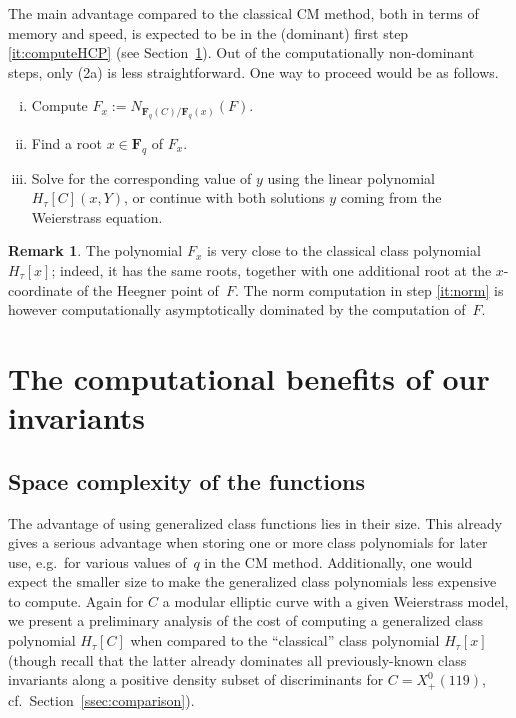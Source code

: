 \documentclass{amsart}
\newcommand{\FF}{\mathbf{F}}
\newcommand{\HC}{H_\tau[\curve]}
\newcommand{\xplus}[1]{X^0_+(#1)}
\newcommand{\curve}{C}
\numberwithin{equation}{section}
\theoremstyle{definition}
\newtheorem{remark}[equation]{Remark}
\begin{document}
The main advantage compared to the classical CM method,
both in terms of memory and speed, is expected to be
in the (dominant) first step \eqref{it:computeHCP}
(see Section~\ref{sec:runtime}).
Out of the computationally non-dominant steps,
only (2a) is less straightforward. One way to proceed would be as follows.

\begin{enumerate}[(i)]
\item\label{it:norm} Compute $F_x:=N_{\FF_q(\curve)/\FF_q(x)}(F)$.
\item Find a root $x\in\FF_q$ of $F_x$.
\item Solve for the corresponding value of $y$
using the linear polynomial $\HC(x,Y)$, 
or continue with both solutions $y$ coming from the Weierstrass equation.
\end{enumerate}

\begin{remark}
The polynomial $F_x$ is very close to the classical class polynomial $H_{\tau}[x]$;
indeed, it has the same roots, together with one additional root at the
$x$-coordinate of the Heegner point of~$F$.
The norm computation in step \eqref{it:norm} is however computationally
asymptotically dominated by the computation of~$F$.
\end{remark}
	

    
    \section{The computational benefits of our invariants}\label{sec:runtime}
    
    \subsection{Space complexity of the functions}
    
    The advantage of using generalized class functions lies in their size.
    This already gives a serious advantage when storing
    one or more class polynomials for later use,
    e.g.\ for various
    values of~$q$ in the CM method.
    Additionally, one would expect the smaller size to make the generalized class polynomials less expensive to compute.
    Again for $C$ a modular elliptic curve with a given Weierstrass model, we present a preliminary analysis of the cost of computing a generalized class polynomial $H_{\tau}[C]$ when compared to the ``classical'' class polynomial $H_{\tau}[x]$ (though recall that the latter already dominates all previously-known class invariants along a positive density subset of discriminants for
    $C=\xplus{119}$, cf.\ Section~\ref{ssec:comparison}).
    
\end{document}

